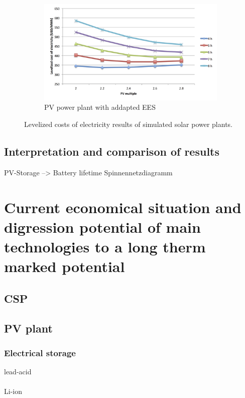 \documentclass[Master,MEE,english]{twbook}%
\begin{document}
\begin{figure}[p]
        \begin{subfigure}[b]{0.75\textwidth}
                \centering
                \includegraphics[width=1.05\textwidth]{FIG/PV_LCOE}
                \caption{PV power plant with addapted EES}\label{PV_LCOE}
        \end{subfigure}%
        \caption[Levelized costs of electricity results of simulated solar power plants.]{Levelized costs of electricity results of simulated solar power plants.}\label{LCOE}
\end{figure}

\section{Interpretation and comparison of results}
PV-Storage --> Battery lifetime
Spinnennetzdiagramm 

\chapter{Current economical situation and digression potential of main technologies to a long therm marked potential}
\section{CSP}
\cite{Smith2012}

\section{PV plant}

\subsection{Electrical storage}
lead-acid\\
\\
Li-ion\cite{Nykvist2015}
\end{document}
